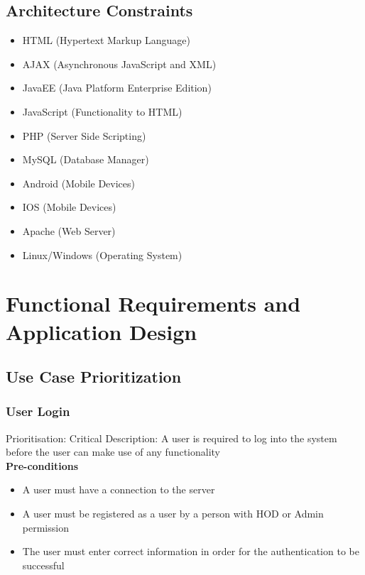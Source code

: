 \documentclass[a4paper]{article}
\begin{document}
	\subsection{Architecture Constraints}
	
	\begin{itemize}
		\item HTML (Hypertext Markup Language)
		\item AJAX (Asynchronous JavaScript and XML)
		\item JavaEE (Java Platform Enterprise Edition)
		\item JavaScript (Functionality to HTML)
		\item PHP (Server Side Scripting)
		\item MySQL (Database Manager)
		\item Android (Mobile Devices)
		\item IOS (Mobile Devices)
		\item Apache (Web Server)
		\item Linux/Windows (Operating System)
		
	\end{itemize}
	
	\section{Functional Requirements and Application Design}
	
	\subsection{Use Case Prioritization}
	\subsubsection{User Login}
    	Prioritisation: Critical
    	Description:  A user is required to log into the system before the user can make use of any functionality\\
    \textbf{Pre-conditions}
    \begin{itemize}
        \item A user must have a connection to the server
        \item A user must be registered as a user by a person with HOD or Admin permission
        \item The user must enter correct information in order for the authentication to be successful
    \end{itemize}
    
\end{document}
